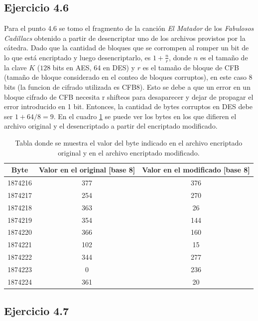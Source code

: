 \documentclass[a4paper,10pt]{article}
\begin{document}
\subsection{Ejercicio 4.6}
Para el punto 4.6 se tomo el fragmento de la canci\'on \emph{El Matador} de los \emph{Fabulosos Cadillacs} 
obtenido a partir de desencriptar uno de los archivos provistos por la c\'atedra.
Dado que la cantidad de bloques que se corrompen al romper un bit de lo que est\'a encriptado y luego
desencriptarlo, es $1 + \frac{n}{r}$, donde $n$ es el tamaño de la clave $K$ ($128$ bits en AES, 64 en DES) y $r$ es el tamaño de
bloque de CFB (tamaño de bloque considerado en el conteo de bloques corruptos), en este caso 8 bits (la funcion de cifrado utilizada es CFB8). Esto se debe a que un error en un bloque cifrado de CFB necesita r shifteos para desaparecer y dejar de propagar el error introducido en 1 bit. Entonces, la cantidad de bytes corruptos en DES debe ser $1 + 64/8 = 9$.
En el cuadro \ref{table46} se puede ver los bytes en los que difieren el archivo original y el desencriptado a partir
del encriptado modificado.
\begin{table}
\begin{center}
\begin{tabular}{|c|c|c|}
\hline
Byte & Valor en el original [base 8] & Valor en el modificado [base 8]\\
\hline
\hline
1874216 & 377 & 376 \\
1874217 & 254 & 270 \\
1874218 & 363 & 26 \\
1874219 & 354 & 144 \\
1874220 & 366 & 160 \\
1874221 & 102 & 15 \\
1874222 & 344 & 277 \\
1874223 & 0 & 236 \\
1874224 & 361 & 20 \\
\hline
\end{tabular}
\end{center}
\caption{Tabla donde se muestra el valor del byte indicado en el archivo encriptado original y en el archivo encriptado modificado.}
\label{table46}
\end{table}

\subsection{Ejercicio 4.7}
\end{document}
